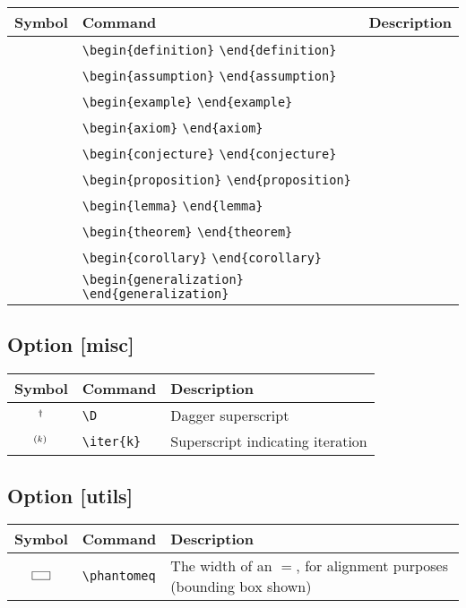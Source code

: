 \documentclass{article}
\begin{document}
\begin{tabular}{cll}
  \toprule
  Symbol & Command & Description \\
  \midrule
  & \verb|\begin{definition}| \verb|\end{definition}| & \\
  & \verb|\begin{assumption}| \verb|\end{assumption}| & \\
  & \verb|\begin{example}| \verb|\end{example}| & \\
  \midrule
  & \verb|\begin{axiom}| \verb|\end{axiom}| & \\
  & \verb|\begin{conjecture}| \verb|\end{conjecture}| & \\
  & \verb|\begin{proposition}| \verb|\end{proposition}| & \\
  & \verb|\begin{lemma}| \verb|\end{lemma}| & \\
  & \verb|\begin{theorem}| \verb|\end{theorem}| & \\
  & \verb|\begin{corollary}| \verb|\end{corollary}| & \\
  & \verb|\begin{generalization}| \verb|\end{generalization}| & \\
  \bottomrule
\end{tabular}

\subsection*{Option [misc]}

\begin{tabular}{cll}
  \toprule
  Symbol & Command & Description \\
  \midrule
  $^{\dag}$ & \verb|\D| & Dagger superscript \\
  $^{(k)}$ & \verb|\iter{k}| & Superscript indicating iteration \\
  \bottomrule
\end{tabular}

\subsection*{Option [utils]}

\begin{tabular}{cll}
  \toprule
  Symbol & Command & Description \\
  \midrule
  $\fbox{\phantomeq}$ & \verb|\phantomeq| & The width of an $=$, for alignment purposes (bounding box shown) \\
  \bottomrule
\end{tabular}
\end{document}
